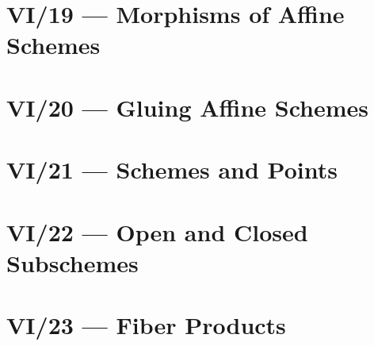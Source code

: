 \section{VI/19 --- Morphisms of Affine Schemes}




\section{VI/20 --- Gluing Affine Schemes}




\section{VI/21 --- Schemes and Points}




\section{VI/22 --- Open and Closed Subschemes}





\section{VI/23 --- Fiber Products}







